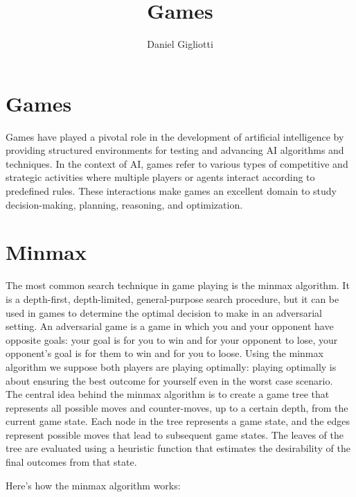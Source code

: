 \documentclass{article}
\title{Games}
\author{Daniel Gigliotti}
\date{}
\begin{document}
\maketitle

\section{Games}

Games have played a pivotal role in the development of artificial intelligence by providing structured environments for testing and advancing AI algorithms and techniques. In the context of AI, games refer to various types of competitive and strategic activities where multiple players or agents interact according to predefined rules. These interactions make games an excellent domain to study decision-making, planning, reasoning, and optimization.

\section{Minmax}

The most common search technique in game playing is the minmax algorithm. 
It is a depth-first, depth-limited, general-purpose search procedure, but it can be used in games to determine the optimal decision to make in an adversarial setting. An adversarial game is a game in which you and your opponent have opposite goals: your goal is for you to win and for your opponent to lose, your opponent's goal is for them to win and for you to loose. Using the minmax algorithm we suppose both players are playing optimally: playing optimally is about ensuring the best outcome for yourself even in the worst case scenario. \\

The central idea behind the minmax algorithm is to create a game tree that represents all possible moves and counter-moves, up to a certain depth, from the current game state. Each node in the tree represents a game state, and the edges represent possible moves that lead to subsequent game states. The leaves of the tree are evaluated using a heuristic function that estimates the desirability of the final outcomes from that state.

\newpage

Here's how the minmax algorithm works:
\end{document}
